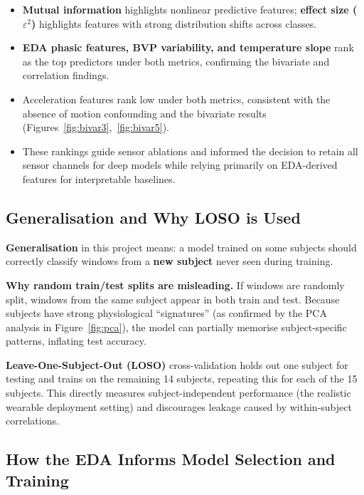 \documentclass[11pt]{article}
\begin{document}
\begin{itemize}
  \item \textbf{Mutual information} highlights nonlinear predictive features; \textbf{effect size ($\varepsilon^2$)} highlights features with strong distribution shifts across classes.
  \item \textbf{EDA phasic features, BVP variability, and temperature slope} rank as the top predictors under both metrics, confirming the bivariate and correlation findings.
  \item Acceleration features rank low under both metrics, consistent with the absence of motion confounding and the bivariate results (Figures~\ref{fig:bivar3},~\ref{fig:bivar5}).
  \item These rankings guide sensor ablations and informed the decision to retain all sensor channels for deep models while relying primarily on EDA-derived features for interpretable baselines.
\end{itemize}

\subsection{Generalisation and Why LOSO is Used}

\textbf{Generalisation} in this project means: a model trained on some subjects should correctly classify windows from a \textbf{new subject} never seen during training.

\textbf{Why random train/test splits are misleading.}
If windows are randomly split, windows from the same subject appear in both train and test.
Because subjects have strong physiological ``signatures'' (as confirmed by the PCA analysis in Figure~\ref{fig:pca}), the model can partially memorise subject-specific patterns, inflating test accuracy.

\textbf{Leave-One-Subject-Out (LOSO)} cross-validation holds out one subject for testing and trains on the remaining 14 subjects, repeating this for each of the 15 subjects.
This directly measures subject-independent performance (the realistic wearable deployment setting) and discourages leakage caused by within-subject correlations.

\subsection{How the EDA Informs Model Selection and Training}
\end{document}
